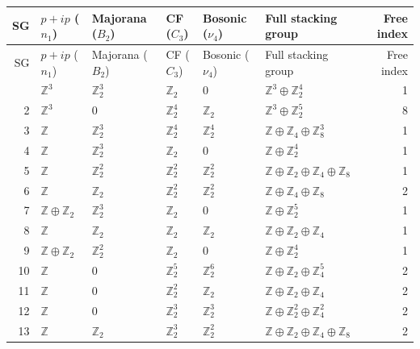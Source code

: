 \documentclass[10pt]{article}
\begin{document}
\begin{longtable}{rlllllr}
\toprule
SG & $p+ip$ ($n_1$) & Majorana ($B_2$) & CF ($C_3$) & Bosonic ($\nu_4$) & Full stacking group & Free index\\
\midrule
\endfirsthead
\toprule
SG & $p+ip$ ($n_1$) & Majorana ($B_2$) & CF ($C_3$) & Bosonic ($\nu_4$) & Full stacking group & Free index\\
\midrule
\endhead
\bottomrule
\endfoot
1 & $\mathbb{Z}^{3}$ & $\mathbb{Z}_{2}^{3}$ & $\mathbb{Z}_{2}$ & $0$ & $\mathbb{Z}^{3}\oplus \mathbb{Z}_{2}^{4}$ & 1 \\
2 & $\mathbb{Z}^{3}$ & $0$ & $\mathbb{Z}_{2}^{4}$ & $\mathbb{Z}_{2}$ & $\mathbb{Z}^{3}\oplus \mathbb{Z}_{2}^{5}$ & 8 \\
3 & $\mathbb{Z}$ & $\mathbb{Z}_{2}^{3}$ & $\mathbb{Z}_{2}^{4}$ & $\mathbb{Z}_{2}^{4}$ & $\mathbb{Z}\oplus \mathbb{Z}_{4}\oplus \mathbb{Z}_{8}^{3}$ & 1 \\
4 & $\mathbb{Z}$ & $\mathbb{Z}_{2}^{3}$ & $\mathbb{Z}_{2}$ & $0$ & $\mathbb{Z}\oplus \mathbb{Z}_{2}^{4}$ & 1 \\
5 & $\mathbb{Z}$ & $\mathbb{Z}_{2}^{2}$ & $\mathbb{Z}_{2}^{2}$ & $\mathbb{Z}_{2}^{2}$ & $\mathbb{Z}\oplus \mathbb{Z}_{2}\oplus \mathbb{Z}_{4}\oplus \mathbb{Z}_{8}$ & 1 \\
6 & $\mathbb{Z}$ & $\mathbb{Z}_{2}$ & $\mathbb{Z}_{2}^{2}$ & $\mathbb{Z}_{2}^{2}$ & $\mathbb{Z}\oplus \mathbb{Z}_{4}\oplus \mathbb{Z}_{8}$ & 2 \\
7 & $\mathbb{Z}\oplus \mathbb{Z}_{2}$ & $\mathbb{Z}_{2}^{3}$ & $\mathbb{Z}_{2}$ & $0$ & $\mathbb{Z}\oplus \mathbb{Z}_{2}^{5}$ & 1 \\
8 & $\mathbb{Z}$ & $\mathbb{Z}_{2}$ & $\mathbb{Z}_{2}$ & $\mathbb{Z}_{2}$ & $\mathbb{Z}\oplus \mathbb{Z}_{2}\oplus \mathbb{Z}_{4}$ & 1 \\
9 & $\mathbb{Z}\oplus \mathbb{Z}_{2}$ & $\mathbb{Z}_{2}^{2}$ & $\mathbb{Z}_{2}$ & $0$ & $\mathbb{Z}\oplus \mathbb{Z}_{2}^{4}$ & 1 \\
10 & $\mathbb{Z}$ & $0$ & $\mathbb{Z}_{2}^{5}$ & $\mathbb{Z}_{2}^{6}$ & $\mathbb{Z}\oplus \mathbb{Z}_{2}\oplus \mathbb{Z}_{4}^{5}$ & 2 \\
11 & $\mathbb{Z}$ & $0$ & $\mathbb{Z}_{2}^{2}$ & $\mathbb{Z}_{2}$ & $\mathbb{Z}\oplus \mathbb{Z}_{2}\oplus \mathbb{Z}_{4}$ & 2 \\
12 & $\mathbb{Z}$ & $0$ & $\mathbb{Z}_{2}^{3}$ & $\mathbb{Z}_{2}^{3}$ & $\mathbb{Z}\oplus \mathbb{Z}_{2}^{2}\oplus \mathbb{Z}_{4}^{2}$ & 2 \\
13 & $\mathbb{Z}$ & $\mathbb{Z}_{2}$ & $\mathbb{Z}_{2}^{3}$ & $\mathbb{Z}_{2}^{2}$ & $\mathbb{Z}\oplus \mathbb{Z}_{2}\oplus \mathbb{Z}_{4}\oplus \mathbb{Z}_{8}$ & 2 \\

\end{longtable}
\end{document}
